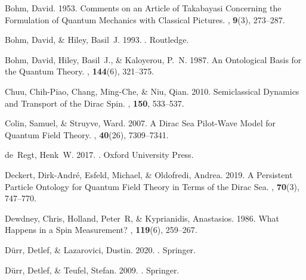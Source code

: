 \documentclass[onecolumn,secnumarabic,amsmath,amssymb,balancelastpage,nofootinbib]{article}
\begin{document}
\begin{thebibliography}{}
Bohm, David. 1953.
\newblock Comments on an Article of Takabayasi Concerning the Formulation of
  Quantum Mechanics with Classical Pictures.
, {\bf 9}(3), 273--287.

Bohm, David, \& Hiley, Basil~J. 1993.
.
\newblock Routledge.

Bohm, David, Hiley, Basil~J., \& Kaloyerou, P.~N. 1987.
\newblock An Ontological Basis for the Quantum Theory.
, {\bf 144}(6), 321--375.

Chuu, Chih-Piao, Chang, Ming-Che, \& Niu, Qian. 2010.
\newblock Semiclassical Dynamics and Transport of the Dirac Spin.
, {\bf 150}, 533--537.

Colin, Samuel, \& Struyve, Ward. 2007.
\newblock A Dirac Sea Pilot-Wave Model for Quantum Field Theory.
, {\bf 40}(26), 7309--7341.

de~Regt, Henk~W. 2017.
.
\newblock Oxford University Press.

Deckert, Dirk-Andr\'{e}, Esfeld, Michael, \& Oldofredi, Andrea. 2019.
\newblock A Persistent Particle Ontology for Quantum Field Theory in Terms of
  the Dirac Sea.
, {\bf 70}(3),
  747--770.

Dewdney, Chris, Holland, Peter~R, \& Kyprianidis, Anastasios. 1986.
\newblock What Happens in a Spin Measurement?
, {\bf 119}(6), 259--267.

D\"{u}rr, Detlef, \& Lazarovici, Dustin. 2020.
.
\newblock Springer.

D\"{u}rr, Detlef, \& Teufel, Stefan. 2009.
.
\newblock Springer.


\end{thebibliography}
\end{document}
